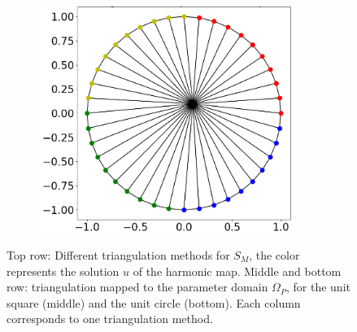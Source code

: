 \begin{figure}
\begin{subfigure}[t]{0.31\textwidth}
  \end{subfigure}
  \quad
  \begin{subfigure}[t]{0.31\textwidth}%
    \centering%
    \includegraphics[width=0.9\textwidth, trim=37mm 14mm 6mm 6mm, clip]{images/fiber_creation/mesh_plots/out_2_0_0_tri.png}%
    \label{fig:w_20}%
  \end{subfigure}
  
  \caption{Top row: Different triangulation methods for $S_M$, the color represents the solution $u$ of the harmonic map. Middle and bottom row: triangulation mapped to the parameter domain $\Omega_P$, for the unit square (middle) and the unit circle (bottom). Each column corresponds to one triangulation method.}%
  \label{fig:tri_triangulations}%
\end{figure}%



